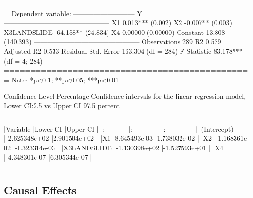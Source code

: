\documentclass{beamer}
\begin{document}
\begin{frame}[fragile]
\begin{Schunk}
\begin{Soutput}
===============================================
                        Dependent variable:    
                    ---------------------------
                                 Y             
-----------------------------------------------
X1                       0.013*** (0.002)      
X2                       -0.007** (0.003)      
X3LANDSLIDE             -64.158** (24.834)     
X4                       0.00000 (0.00000)     
Constant                 13.808 (140.393)      
-----------------------------------------------
Observations                    289            
R2                             0.539           
Adjusted R2                    0.533           
Residual Std. Error     163.304 (df = 284)     
F Statistic           83.178*** (df = 4; 284)  
===============================================
Note:               *p<0.1; **p<0.05; ***p<0.01
\end{Soutput}
\end{Schunk}
\end{frame}

\begin{frame}[fragile]{Confidence Level Percentage}
Confidence intervals for the linear regression model, Lower CI:2.5 vs Upper CI 97.5 percent
\begin{columns}[c] %
\begin{Schunk}
\begin{Soutput}
|Variable    |Lower CI      |Upper CI      |
|:-----------|:-------------|:-------------|
|(Intercept) |-2.625348e+02 |2.901504e+02  |
|X1          |8.645493e-03  |1.738032e-02  |
|X2          |-1.168361e-02 |-1.323314e-03 |
|X3LANDSLIDE |-1.130398e+02 |-1.527593e+01 |
|X4          |-4.348301e-07 |6.305344e-07  |
\end{Soutput}
\end{Schunk}
\end{columns}
\end{frame}


\subsection{Causal Effects}
\end{document}
